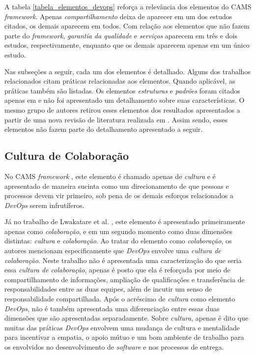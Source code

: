 A tabela \ref{tabela_elementos_devops} reforça a relevância dos elementos do
\acrshort{CAMS} \textit{framework}. Apenas \emph{compartilhamento} deixa de
aparecer em um dos estudos citados, os demais aparecem em todos. Com relação
aos elementos que não fazem parte do \textit{framework}, \emph{garantia
da qualidade} e \emph{serviços} aparecem em três e dois estudos, respectivamente,
enquanto que os demais aparecem apenas em um único estudo.

Nas subseções a seguir, cada um dos elementos é detalhado. Alguns dos trabalhos
relacionados citam práticas relacionadas aos elementos. Quando aplicável, as
práticas também são listadas. Os elementos \emph{estruturas} e \emph{padrões}
foram citados apenas em \cite{cooperation_dev_ops_esem_2014} e não foi
apresentado um detalhamento sobre suas características. O mesmo grupo de
autores retirou esses elementos dos resultados apresentados a partir de uma
nova revisão de literatura realizada em \cite{qualitative_devops_journalsw_17}.
Assim sendo, esses elementos não fazem parte do detalhamento apresentado a
seguir.

\subsection{Cultura de Colaboração}

No \acrshort{CAMS} \textit{framework} \cite{what_devops_means_2010}, este
elemento é chamado apenas de \emph{cultura} e é apresentado de maneira sucinta
como um direcionamento de que pessoas e processos devem vir primeiro, sob pena
de os demais esforços relacionados a \textit{DevOps} serem infrutíferos.

Já no trabalho de Lwakatare et al. \cite{dimensions_of_devops,extending_dimensions},
este elemento é apresentado primeiramente apenas como \emph{colaboração}, e em
um segundo momento como duas dimensões distintas: \emph{cultura} e
\emph{colaboração}. Ao tratar do elemento como \emph{colaboração}, os autores
mencionam especificamente que \textit{DevOps} envolve uma \emph{cultura de colaboração}.
Neste trabalho não é apresentada uma caracterização do que seria essa \emph{cultura
de colaboração}, apenas é posto que ela é reforçada por meio de
compartilhamento de informações, ampliação de qualificações e transferência de
responsabilidades entre as duas equipes, além de incutir um senso de
responsabilidade compartilhada. Após o acréscimo de \emph{cultura} como elemento
\textit{DevOps}, não é também apresentada uma diferenciação entre essas duas
dimensões que são apresentadas separadamente. Sobre \emph{cultura}, apenas é
dito que muitas das práticas \textit{DevOps} envolvem uma mudança de cultura e
mentalidade para incentivar a empatia, o apoio mútuo e um bom ambiente de
trabalho para os envolvidos no desenvolvimento de \textit{software} e
nos processos de entrega.

